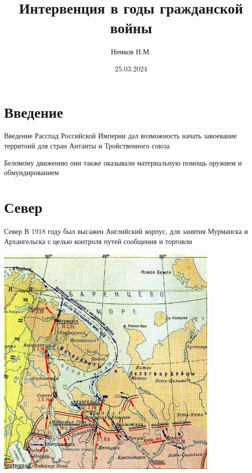 

\title{Интервенция в годы гражданской войны}
\author{Немков Н.М.}
\date{25.03.2024}



\begin{frame}
\maketitle
\end{frame}

\section{Введение}
\begin{frame}{Введение}
	Расспад Российской Империи дал возможность начать завоевание территоий для стран Антанты и Тройственного союза

	Беломому движению они также оказывали материальную помощь оружием и обмундированием
\end{frame}

\section{Север}
\begin{frame}{Север}
	В 1918 году был высажен Английский корпус, для занятия Мурманска и Архангельска с целью контроля путей сообщения и торговли
\end{frame}



\begin{frame}{}
	\includegraphics[width=0.8\textwidth]{images/int-north.jpg}
\end{frame}



